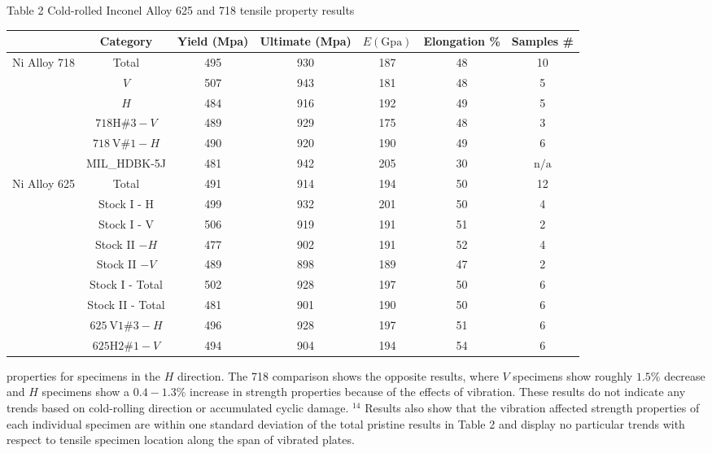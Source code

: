 \documentclass[10pt]{article}
\begin{document}
Table 2 Cold-rolled Inconel Alloy 625 and 718 tensile property results

\begin{center}
\begin{tabular}{|c|c|c|c|c|c|c|}
\hline
 & Category & Yield (Mpa) & Ultimate (Mpa) & $E(\mathrm{Gpa})$ & Elongation \% & Samples \# \\
\hline
\multirow{6}{*}{Ni Alloy 718} & Total & 495 & 930 & 187 & 48 & 10 \\
\hline
 & $V$ & 507 & 943 & 181 & 48 & 5 \\
\hline
 & $H$ & 484 & 916 & 192 & 49 & 5 \\
\hline
 & $718 \mathrm{H} \# 3-V$ & 489 & 929 & 175 & 48 & 3 \\
\hline
 & $718 \mathrm{~V} \# 1-H$ & 490 & 920 & 190 & 49 & 6 \\
\hline
 & MIL\_HDBK-5J & 481 & 942 & 205 & 30 & $\mathrm{n} / \mathrm{a}$ \\
\hline
\multirow{9}{*}{Ni Alloy 625} & Total & 491 & 914 & 194 & 50 & 12 \\
\hline
 & Stock I - H & 499 & 932 & 201 & 50 & 4 \\
\hline
 & Stock I - V & 506 & 919 & 191 & 51 & 2 \\
\hline
 & Stock II $-H$ & 477 & 902 & 191 & 52 & 4 \\
\hline
 & Stock II $-V$ & 489 & 898 & 189 & 47 & 2 \\
\hline
 & Stock I - Total & 502 & 928 & 197 & 50 & 6 \\
\hline
 & Stock II - Total & 481 & 901 & 190 & 50 & 6 \\
\hline
 & $625 \mathrm{~V} 1 \# 3-H$ & 496 & 928 & 197 & 51 & 6 \\
\hline
 & $625 \mathrm{H} 2 \# 1-V$ & 494 & 904 & 194 & 54 & 6 \\
\hline
\end{tabular}
\end{center}

properties for specimens in the $H$ direction. The 718 comparison shows the opposite results, where $V$ specimens show roughly $1.5 \%$ decrease and $H$ specimens show a $0.4-1.3 \%$ increase in strength properties because of the effects of vibration. These results do not indicate any trends based on cold-rolling direction or accumulated cyclic damage. ${ }^{14}$ Results also show that the vibration affected strength properties of each individual specimen are within one standard deviation of the total pristine results in Table 2 and display no particular trends with respect to tensile specimen location along the span of vibrated plates.
\end{document}
